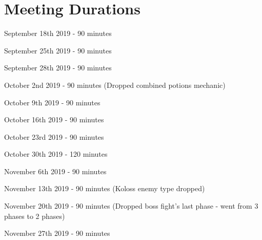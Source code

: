 \documentclass{article}
\begin{document}
\section{Meeting Durations}
\begin{description}
	\item September 18th 2019 - 90 minutes 
	\item September 25th 2019 - 90 minutes
	\item September 28th 2019 - 90 minutes
	\item October 2nd 2019 - 90 minutes (Dropped combined potions mechanic)
	\item October 9th 2019 - 90 minutes
	\item October 16th 2019 - 90 minutes
	\item October 23rd 2019 - 90 minutes
	\item October 30th 2019 - 120 minutes
	\item November 6th 2019 - 90 minutes
	\item November 13th 2019 - 90 minutes (Koloss enemy type dropped)
	\item November 20th 2019 - 90 minutes (Dropped boss fight's last phase - went from 3 phases to 2 phases)
	\item November 27th 2019 - 90 minutes
	\end{description}
\end{document}

